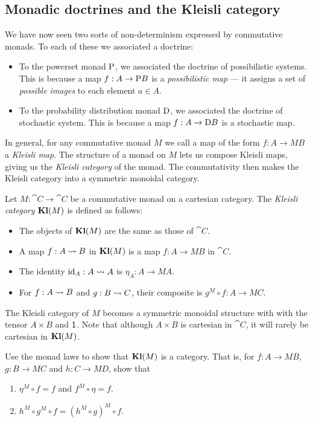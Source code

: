 \documentclass[DynamicalBook]{subfiles}
\begin{document}
\subsection{Monadic doctrines and the Kleisli category}
We have now seen two sorts of non-determinism expressed by commutative monads.
To each of these we associated a doctrine:
\begin{itemize}
  \item To the powerset monad $\mathrm{P}$, we associated the doctrine of
    possibilistic systems. This is because a map $f : A \to \mathrm{P} B$ is a
    \emph{possibilistic map} --- it assigns
    a set of \emph{possible images} to each element $a \in A$. 
  \item To the probability distribution monad $\mathrm{D}$, we associated the
    doctrine of stochastic system. This is because a map $f : A \to \mathrm{D} B$
    is a stochastic map.
\end{itemize}
In general, for any commutative monad $M$ we call a map of the form $f : A \to
MB$ a \emph{Kleisli map}. The structure of a monad on $M$ lets us compose
Kleisli maps, giving us the \emph{Kleisli category} of the monad. The
commutativity then makes the Kleisli category into a symmetric monoidal category.
\begin{definition}
  Let $M : \cat{C} \to \cat{C}$ be a commutative monad on a cartesian category. The \emph{Kleisli category} $\textbf{Kl}(M)$ is
  defined as follows:
  \begin{itemize}
    \item The objects of $\textbf{Kl}(M)$ are the same as those of $\cat{C}$.
    \item A map $f : A \rightsquigarrow B$ in $\textbf{Kl}(M)$ is a map $f : A \to MB$ in $\cat{C}$.
    \item The identity $\mathrm{id}_A : A \rightsquigarrow A$ is $\eta_A : A \to MA$.
    \item For $f : A \rightsquigarrow B$ and $g : B \rightsquigarrow C$, their composite is $g^M
      \circ f : A \to MC$.
  \end{itemize}
  The Kleisli category of $M$ becomes a symmetric monoidal structure with with
  the tensor $A \times B$ and $\mathsf{1}$. Note that although $A \times B$ is
  cartesian in $\cat{C}$, it will rarely be cartesian in $\textbf{Kl}(M)$.
\end{definition}

\begin{exercise}
  Use the monad laws to show that $\textbf{Kl}(M)$ is a category. That is, for $f :
  A \to M B$, $g : B \to MC$ and $h : C \to MD$, show that
  \begin{enumerate}
    \item $\eta^M \circ f = f$ and $f^M \circ \eta = f$.
    \item $h^M \circ g^M \circ f = (h^M \circ g)^M \circ f$.
  \end{enumerate}
\end{exercise}
\end{document}
